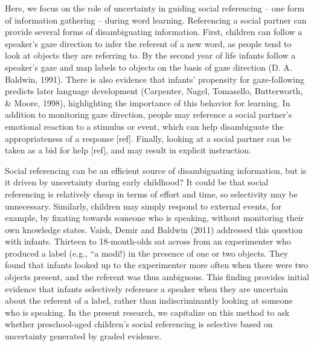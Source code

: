 \documentclass[10pt, letterpaper]{article}
\begin{document}
Here, we focus on the role of uncertainty in guiding social referencing
-- one form of information gathering -- during word learning.
Referencing a social partner can provide several forms of disambiguating
information. First, children can follow a speaker's gaze direction to
infer the referent of a new word, as people tend to look at objects they
are referring to. By the second year of life infants follow a speaker's
gaze and map labels to objects on the basis of gaze direction (D. A.
Baldwin, 1991). There is also evidence that infants' propensity for
gaze-following predicts later language development (Carpenter, Nagel,
Tomasello, Butterworth, \& Moore, 1998), highlighting the importance of
this behavior for learning. In addition to monitoring gaze direction,
people may reference a social partner's emotional reaction to a stimulus
or event, which can help disambiguate the appropriateness of a response
{[}ref{]}. Finally, looking at a social partner can be taken as a bid
for help {[}ref{]}, and may result in explicit instruction.

Social referencing can be an efficient source of disambiguating
information, but is it driven by uncertainty during early childhood? It
could be that social referencing is relatively cheap in terms of effort
and time, so selectivity may be unnecessary. Similarly, children may
simply respond to external events, for example, by fixating towards
someone who is speaking, without monitoring their own knowledge states.
Vaish, Demir and Baldwin (2011) addressed this question with infants.
Thirteen to 18-month-olds sat across from an experimenter who produced a
label (e.g., ``a modi!) in the presence of one or two objects. They
found that infants looked up to the experimenter more often when there
were two objects present, and the referent was thus ambiguous. This
finding provides initial evidence that infants selectively reference a
speaker when they are uncertain about the referent of a label, rather
than indiscriminantly looking at someone who is speaking. In the present
research, we capitalize on this method to ask whether preschool-aged
children's social referencing is selective based on uncertainty
generated by graded evidence.
\end{document}
